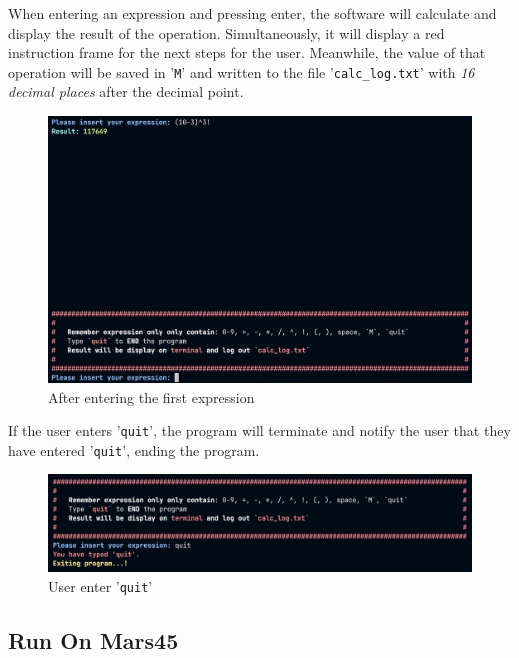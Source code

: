     When entering an expression and pressing enter, the software will calculate and display the result of the operation. Simultaneously, it will display a red instruction frame for the next steps for the user. Meanwhile, the value of that operation will be saved in '\texttt{M}' and written to the file '\texttt{calc\_log.txt}' with \emph{16 decimal places} after the decimal point.
    
    \begin{figure}[htbp]
        \centering
        \includegraphics[width=1\textwidth]{graphics/1.AfterCalculate.png}
        \caption{After entering the first expression}
        \label{fig:1.AfterCalculate}
    \end{figure}
    
    If the user enters '\texttt{quit}', the program will terminate and notify the user that they have entered '\texttt{quit}', ending the program.
    
    \begin{figure}[htbp]
      \centering
      \includegraphics[width=1\textwidth]{graphics/1.Quit.png}
      \caption{User enter '\texttt{quit}'}
      \label{fig:1.EnterQuit}
    \end{figure}

\subsection{Run On Mars45}
\label{sec:1.Mars45}


